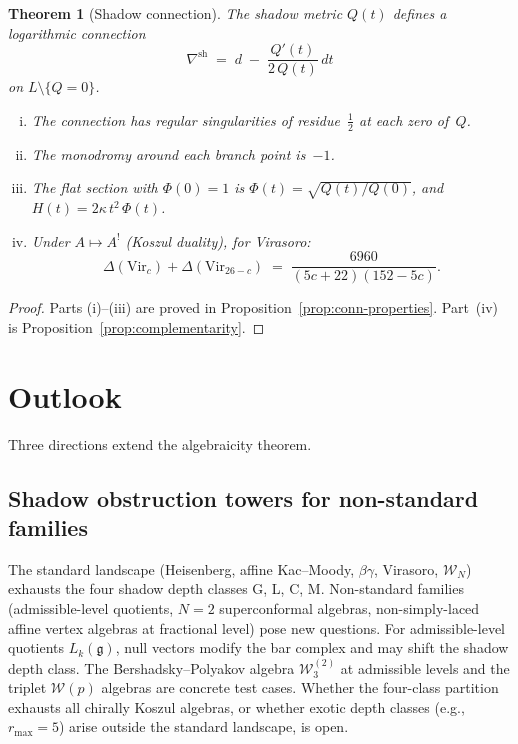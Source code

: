 \documentclass[11pt]{article}
\theoremstyle{plain}
\newtheorem{theorem}{Theorem}[section]
\theoremstyle{definition}
\theoremstyle{remark}
\newcommand{\fg}{\mathfrak{g}}
\newcommand{\cW}{\mathcal{W}}
\begin{document}
\begin{theorem}[Shadow connection]
\label{thm:connection}
The shadow metric $Q(t)$ defines a logarithmic connection
\[
 \nabla^{\mathrm{sh}}
 \;=\; d \;-\; \frac{Q'(t)}{2\,Q(t)}\,dt
\]
on $L \setminus \{Q = 0\}$.
\begin{enumerate}[(i)]
\item The connection has regular singularities of
 residue~$\tfrac{1}{2}$ at each zero of~$Q$.
\item The monodromy around each branch point is~$-1$.
\item The flat section with $\Phi(0) = 1$ is
 $\Phi(t) = \sqrt{Q(t)/Q(0)}$, and
 $H(t) = 2\kappa\,t^2\,\Phi(t)$.
\item Under $A \mapsto A^{!}$ (Koszul duality), for
 Virasoro:
 \[
 \Delta(\mathrm{Vir}_c) + \Delta(\mathrm{Vir}_{26-c})
 \;=\; \frac{6960}{(5c+22)(152-5c)}.
 \]
\end{enumerate}
\end{theorem}

\begin{proof}
Parts (i)--(iii) are proved in
Proposition~\ref{prop:conn-properties}.
Part~(iv) is Proposition~\ref{prop:complementarity}.
\end{proof}

\section{Outlook}\label{sec:outlook}

Three directions extend the algebraicity theorem.


\subsection*{Shadow obstruction towers for non-standard families}

The standard landscape (Heisenberg, affine Kac--Moody,
$\beta\gamma$, Virasoro, $\cW_N$) exhausts the four shadow
depth classes G, L, C, M. Non-standard families
(admissible-level quotients, $N=2$ superconformal algebras,
non-simply-laced affine vertex algebras at fractional level)
pose new questions. For admissible-level quotients
$L_k(\fg)$, null vectors modify the bar complex and may
shift the shadow depth class. The Bershadsky--Polyakov
algebra $\cW_3^{(2)}$ at admissible levels and the triplet
$\cW(p)$ algebras are concrete test cases. Whether the
four-class partition exhausts all chirally Koszul algebras,
or whether exotic depth classes (e.g., $r_{\max} = 5$) arise
outside the standard landscape, is open.
\end{document}
